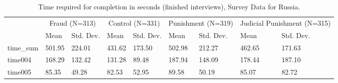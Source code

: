 \begin{table}

\caption{Time required for completion in seconds (finished interviews), Survey Data for Russia.}
\centering
\begin{tabular}[t]{lllllllll}
\toprule
\multicolumn{1}{c}{ } & \multicolumn{2}{c}{Fraud (N=313)} & \multicolumn{2}{c}{Control (N=331)} & \multicolumn{2}{c}{Punishment (N=319)} & \multicolumn{2}{c}{Judicial Punishment (N=315)} \\
\cmidrule(l{3pt}r{3pt}){2-3} \cmidrule(l{3pt}r{3pt}){4-5} \cmidrule(l{3pt}r{3pt}){6-7} \cmidrule(l{3pt}r{3pt}){8-9}
  & Mean & Std. Dev. & Mean  & Std. Dev.  & Mean   & Std. Dev.   & Mean    & Std. Dev.   \\
\midrule
time\_sum & 501.95 & 224.01 & 431.62 & 173.50 & 502.98 & 212.27 & 462.65 & 171.63\\
time004 & 168.29 & 132.42 & 131.28 & 89.48 & 187.94 & 148.09 & 178.44 & 187.10\\
time005 & 85.35 & 49.28 & 82.53 & 52.95 & 89.58 & 50.19 & 85.07 & 82.72\\
\bottomrule
\end{tabular}
\end{table}
